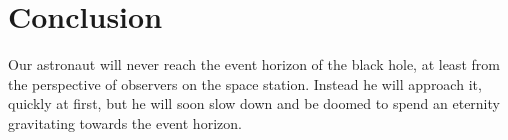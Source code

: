 \documentclass[11pt,english]{article}
\begin{document}
\section*{Conclusion}

Our astronaut will never reach the event horizon of the black hole, at least from the perspective of observers on the space station. Instead he will approach it, quickly at first, but he will soon slow down and be doomed to spend an eternity gravitating towards the event horizon. 

\end{document}
